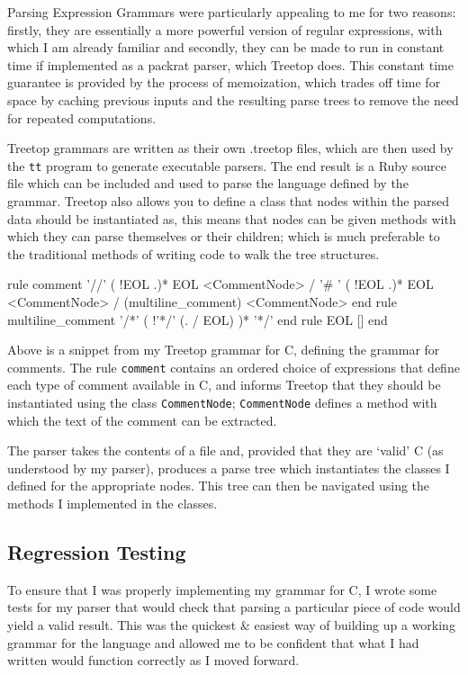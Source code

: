 Parsing Expression Grammars\cite{website:peg} were particularly appealing to me
for two reasons: firstly, they are essentially a more powerful version of
regular expressions, with which I am already familiar and secondly, they can be
made to run in constant time if implemented as a packrat parser, which Treetop
does. This constant time guarantee is provided by the process of memoization,
which trades off time for space by caching previous inputs and the resulting
parse trees to remove the need for repeated computations.

Treetop grammars are written as their own .treetop files, which are then used by
the \lstinline|tt| program to generate executable parsers. The end result is a
Ruby source file which can be included and used to parse the language defined by
the grammar. Treetop also allows you to define a class that nodes within the
parsed data should be instantiated as, this means that nodes can be given
methods with which they can parse themselves or their children; which is much
preferable to the traditional methods of writing code to walk the tree
structures.

\begin{code}[language=treetop]
  rule comment
    '//' ( !EOL .)* EOL <CommentNode>
    / '# ' ( !EOL .)* EOL <CommentNode>
    / (multiline_comment) <CommentNode>
  end
  rule multiline_comment
    '/*'
    (
      !'*/'
      (. / EOL)
    )*
    '*/'
  end
  rule EOL
    [\n]
  end
\end{code}

Above is a snippet from my Treetop grammar for C, defining the grammar for
comments. The rule \lstinline|comment| contains an ordered choice of expressions
that define each type of comment available in C, and informs Treetop that they
should be instantiated using the class \lstinline|CommentNode|;
\lstinline|CommentNode| defines a method with which the text of the comment
can be extracted.

The parser takes the contents of a file and, provided that they are `valid' C
(as understood by my parser), produces a parse tree which instantiates the
classes I defined for the appropriate nodes. This tree can then be navigated
using the methods I implemented in the classes.

  \subsection{Regression Testing}
    To ensure that I was properly implementing my grammar for C, I wrote some
    tests for my parser that would check that parsing a particular piece of code
    would yield a valid result. This was the quickest \& easiest way of building
    up a working grammar for the language and allowed me to be confident that
    what I had written would function correctly as I moved forward.

